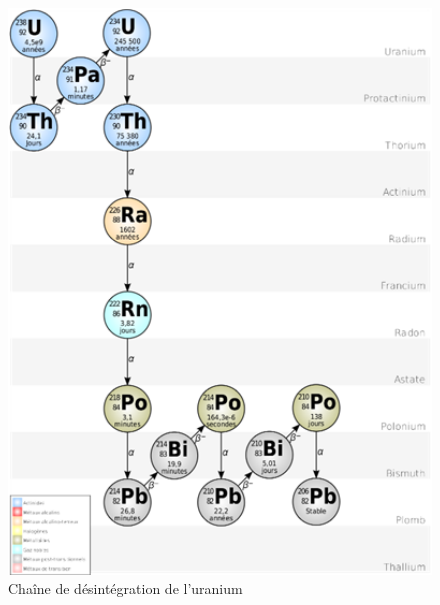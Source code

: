 \documentclass{article}
\begin{document}


\begin{figure}[H]
    \centering
    \includegraphics[width=13cm]{II_A2_1.png}
    \caption{Chaîne de désintégration de l’uranium}
    \label{fig:desintegration_uranium}
\end{figure}
\newpage
\end{document}
